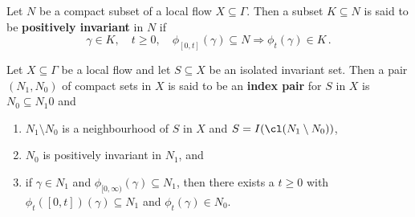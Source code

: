 
\begin{definition}
	Let $N$ be a compact subset of a local flow $X\subseteq \Gamma$. Then a subset $K\subseteq N$ is said to be \textbf{positively invariant} in $N$ if 
	\begin{equation*}
		\gamma \in K , \quad t\geq0,\quad \phi_{[0,t]}(\gamma)\subseteq N \Rightarrow \phi_t(\gamma)\in K\, .
	\end{equation*}
\end{definition}
	
\begin{definition}
	Let $X\subseteq \Gamma$ be a local flow and let $S\subseteq X$ be an isolated invariant set. Then a pair $(N_1,N_0)$ of compact sets in $X$ is said to be an \textbf{index pair} for $S$ in $X$ is $N_0\subseteq N_1$0 and
	\begin{enumerate}
		\item $N_1\setminus N_0$ is a neighbourhood of $S$ in $X$ and $S=I(\cl(N_1\setminus N_0))$,
		\item $N_0$ is positively invariant in $N_1$, and
		\item if $\gamma\in N_1$ and $\phi_{[0,\infty)}(\gamma)\subseteq N_1$, then there exists a $t\geq0$ with $\phi_t([0,t])(\gamma)\subseteq N_1$ and $\phi_t(\gamma)\in N_0$.
	\end{enumerate}
\end{definition}